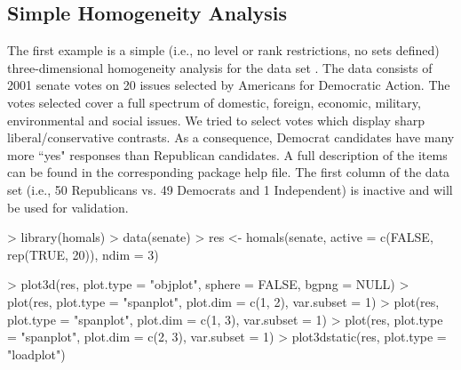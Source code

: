 \documentclass[article]{Z}
\begin{document}
\subsection{Simple Homogeneity Analysis}
\label{sec:sha}
The first example is a simple (i.e., no level or rank restrictions, no sets defined) three-dimensional homogeneity analysis for the  data set \citep{Ada:02}. The data consists of 2001 senate votes on 20 issues selected by Americans for Democratic Action. The votes selected cover a full spectrum of domestic, foreign, economic, military, environmental and social issues. We tried to select votes which display sharp liberal/conservative contrasts. As a consequence, Democrat candidates have many more ``yes" responses than Republican candidates. A full description of the items can be found in the corresponding package help file. The first column of the data set (i.e., 50 Republicans vs. 49 Democrats and 1 Independent) is inactive and will be used for validation.

\begin{Schunk}
\begin{Sinput}
> library(homals)
> data(senate)
> res <- homals(senate, active = c(FALSE, rep(TRUE, 20)), ndim = 3)
\end{Sinput}
\end{Schunk}

\begin{Schunk}
\begin{Sinput}
> plot3d(res, plot.type = "objplot", sphere = FALSE, bgpng = NULL)
> plot(res, plot.type = "spanplot", plot.dim = c(1, 2), var.subset = 1)
> plot(res, plot.type = "spanplot", plot.dim = c(1, 3), var.subset = 1)
> plot(res, plot.type = "spanplot", plot.dim = c(2, 3), var.subset = 1)
> plot3dstatic(res, plot.type = "loadplot")
\end{Sinput}
\end{Schunk}
\end{document}
